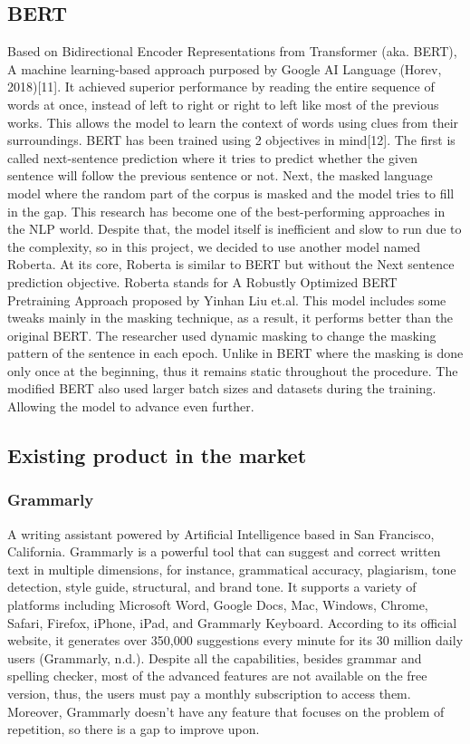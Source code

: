 \documentclass[12pt,oneside,openright,a4paper]{cpe-english-project}
\begin{document}
\subsection{BERT}
Based on Bidirectional Encoder Representations from Transformer (aka. BERT), A machine learning-based approach purposed by Google AI Language (Horev, 2018)[11]. It achieved superior performance by reading the entire sequence of words at once, instead of left to right or right to left like most of the previous works. This allows the model to learn the context of words using clues from their surroundings. BERT has been trained using 2 objectives in mind[12]. The first is called next-sentence prediction where it tries to predict whether the given sentence will follow the previous sentence or not. Next, the masked language model where the random part of the corpus is masked and the model tries to fill in the gap. This research has become one of the best-performing approaches in the NLP world. Despite that, the model itself is inefficient and slow to run due to the complexity, so in this project, we decided to use another model named Roberta. At its core, Roberta is similar to BERT but without the Next sentence prediction objective.
Roberta stands for A Robustly Optimized BERT Pretraining Approach proposed by Yinhan Liu et.al. This model includes some tweaks mainly in the masking technique, as a result, it performs better than the original BERT. The researcher used dynamic masking to change the masking pattern of the sentence in each epoch. Unlike in BERT where the masking is done only once at the beginning, thus it remains static throughout the procedure. The modified BERT also used larger batch sizes and datasets during the training. Allowing the model to advance even further. 

\subsection{Existing product in the market}

\subsubsection{Grammarly} 
A writing assistant powered by Artificial Intelligence based in San Francisco, California. Grammarly is a powerful tool that can suggest and correct written text in multiple dimensions, for instance, grammatical accuracy, plagiarism, tone detection, style guide, structural, and brand tone. It supports a variety of platforms including Microsoft Word, Google Docs, Mac, Windows, Chrome, Safari, Firefox, iPhone, iPad, and Grammarly Keyboard. According to its official website,  it generates over 350,000 suggestions every minute for its 30 million daily users (Grammarly, n.d.). Despite all the capabilities, besides grammar and spelling checker, most of the advanced features are not available on the free version, thus, the users must pay a monthly subscription to access them. Moreover, Grammarly doesn’t have any feature that focuses on the problem of repetition, so there is a gap to improve upon\cite{h}. 
\end{document}
